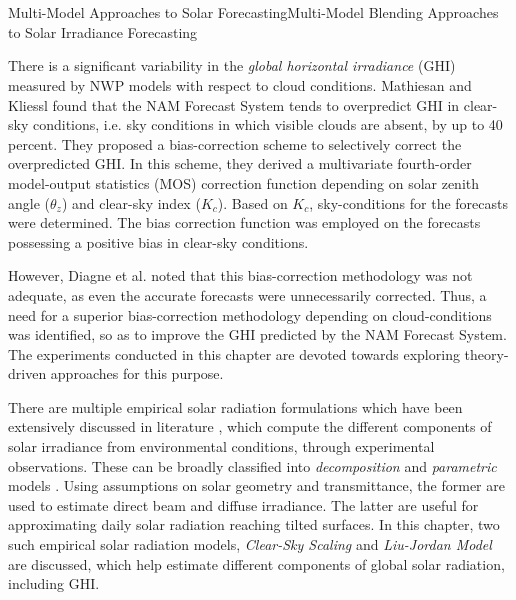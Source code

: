 \chapter{}{{Multi-Model Approaches to Solar Forecasting}}{Multi-Model Blending Approaches to Solar Irradiance Forecasting}

\par There is a significant variability in the \textit{global horizontal irradiance} (GHI) measured by NWP models with respect to cloud conditions. Mathiesan and Kliessl \cite{multimodel_overpredict} found that the NAM Forecast System tends to overpredict GHI in clear-sky conditions, i.e. sky conditions in which visible clouds are absent, by up to 40 percent. They proposed a bias-correction scheme to selectively correct the overpredicted GHI. In this scheme, they derived a multivariate fourth-order model-output statistics (MOS) correction function depending on solar zenith angle ($\theta_z$) and clear-sky index ($K_c$). Based on $K_c$, sky-conditions for the forecasts were determined. The bias correction function was employed on the forecasts possessing a positive bias in clear-sky conditions. 

\par However, Diagne et al. \cite{litrev_nwp5} noted that this bias-correction methodology was not adequate, as even the accurate forecasts were unnecessarily corrected. Thus, a need for a superior bias-correction methodology depending on cloud-conditions was identified, so as to improve the GHI predicted by the NAM Forecast System. The experiments conducted in this chapter are devoted towards exploring theory-driven approaches for this purpose.

\par There are multiple empirical solar radiation formulations which have been extensively discussed in literature \cite{litrev_pvlib10}\cite{litrev_pvlib11}\cite{litrev_pvlib12}\cite{litrev_pvlib13}\cite{litrev_pvlib14}\cite{litrev_pvlib9}, which compute the different components of solar irradiance from environmental conditions, through experimental observations. These can be broadly classified into \textit{decomposition} and \textit{parametric} models \cite{litrev_pvlib3}. Using assumptions on solar geometry and transmittance, the former are used to estimate direct beam and diffuse irradiance. The latter are useful for approximating daily solar radiation reaching tilted surfaces. In this chapter, two such empirical solar radiation models, \textit{Clear-Sky Scaling} and \textit{Liu-Jordan Model} are discussed, which help estimate different components of global solar radiation, including GHI.


